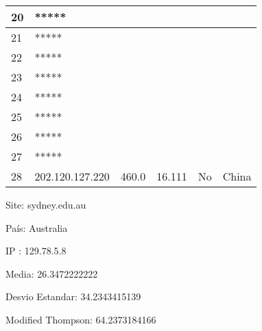 \begin{center}
\begin{tabular}{| l | l | l | l | l | l | }
   20      & *****          &        &        &         &                \\ \hline
   21      & *****          &        &        &         &                \\ \hline
   22      & *****          &        &        &         &                \\ \hline
   23      & *****          &        &        &         &                \\ \hline
   24      & *****          &        &        &         &                \\ \hline
   25      & *****          &        &        &         &                \\ \hline
   26      & *****          &        &        &         &                \\ \hline
   27      & *****          &        &        &         &                \\ \hline
   28      & 202.120.127.220 & 460.0 & 16.111 & No      & China          \\ \hline
    \end{tabular}
\end{center}

Site: sydney.edu.au

País: Australia

IP : 129.78.5.8

Media: 26.3472222222 

Desvio Estandar: 34.2343415139 

Modified Thompson: 64.2373184166

